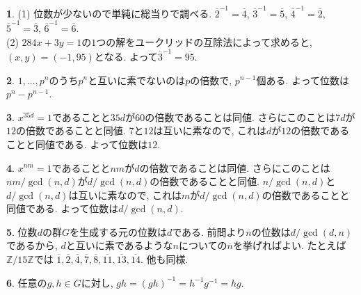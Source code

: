 \documentclass{amsart}
\theoremstyle{definition}
\newtheorem{ans}{}
\numberwithin{ans}{subsection}
\begin{document}
\begin{ans}
  (1) 位数が少ないので単純に総当りで調べる.
  $\overline{2}^{-1} = \overline{4}$,
  $\overline{3}^{-1} = \overline{5}$,
  $\overline{4}^{-1} = \overline{2}$,
  $\overline{5}^{-1} = \overline{3}$,
  $\overline{6}^{-1} = \overline{6}$.\\
  (2) $284x + 3y = 1$の$1$つの解をユークリッドの互除法によって求めると,
  $(x, y) = (-1, 95)$となる. よって$\overline{3}^{-1} = \overline{95}$.
\end{ans}

\begin{ans}
  $1,..., p^n$のうち$p^n$と互いに素でないのは$p$の倍数で, $p^{n-1}$個ある.
  よって位数は$p^n - p^{n-1}$.
\end{ans}

\begin{ans}
  $x^{35d} = 1$であることと$35d$が$60$の倍数であることは同値.
  さらにこのことは$7d$が$12$の倍数であることと同値.
  $7$と$12$は互いに素なので, これは$d$が$12$の倍数であることと同値である.
  よって位数は$12$.
\end{ans}

\begin{ans}
  $x^{nm} = 1$であることと$nm$が$d$の倍数であることは同値.
  さらにこのことは$nm/\gcd(n, d)$が$d/\gcd(n, d)$の倍数であることと同値.
  $n/\gcd(n, d)$と$d/\gcd(n, d)$は互いに素なので, これは$m$が$d/\gcd(n, d)$の倍数であることと同値である.
  よって位数は$d/\gcd(n, d)$.
\end{ans}

\begin{ans}
  位数$d$の群$G$を生成する元の位数は$d$である.
  前問より$\overline{n}$の位数は$d/\gcd(d, n)$であるから,
  $d$と互いに素であるような$n$についての$\overline{n}$を挙げればよい.
  たとえば$\mathbb{Z}/15\mathbb{Z}$では
  $\overline{1}, \overline{2}, \overline{4}, \overline{7}, \overline{8}, \overline{11}, \overline{13}, \overline{14}$.
  他も同様.
\end{ans}

\begin{ans}
  任意の$g, h \in G$に対し,
  $gh = (gh)^{-1} = h^{-1}g^{-1} = hg$.
\end{ans}
\end{document}
